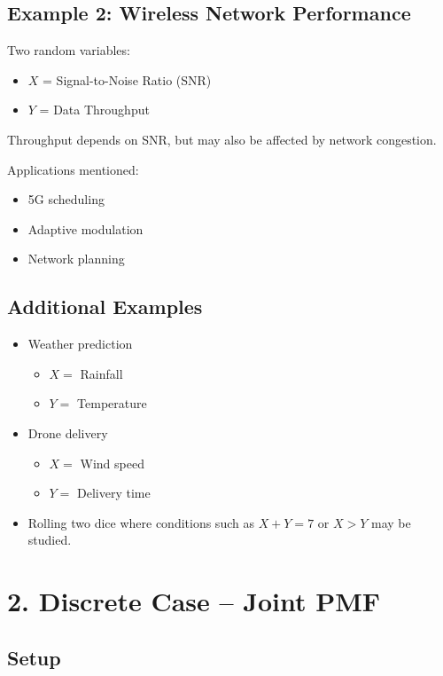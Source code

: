 \documentclass[12pt]{article}
\begin{document}
\subsection*{Example 2: Wireless Network Performance}

Two random variables:

\begin{itemize}
\item $X$ = Signal-to-Noise Ratio (SNR)
\item $Y$ = Data Throughput
\end{itemize}

Throughput depends on SNR, but may also be affected by network congestion.

Applications mentioned:

\begin{itemize}
\item 5G scheduling
\item Adaptive modulation
\item Network planning
\end{itemize}

\subsection*{Additional Examples}

\begin{itemize}
\item Weather prediction
\begin{itemize}
\item $X =$ Rainfall
\item $Y =$ Temperature
\end{itemize}

\item Drone delivery
\begin{itemize}
\item $X =$ Wind speed
\item $Y =$ Delivery time
\end{itemize}

\item Rolling two dice where conditions such as $X+Y=7$ or $X>Y$ may be studied.
\end{itemize}

\section*{2. Discrete Case -- Joint PMF}

\subsection*{Setup}
\end{document}
